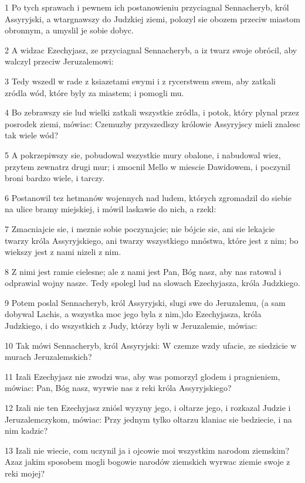 \par 1 Po tych sprawach i pewnem ich postanowieniu przyciagnal Sennacheryb, król Assyryjski, a wtargnawszy do Judzkiej ziemi, polozyl sie obozem przeciw miastom obronnym, a umyslil je sobie dobyc.
\par 2 A widzac Ezechyjasz, ze przyciagnal Sennacheryb, a iz twarz swoje obrócil, aby walczyl przeciw Jeruzalemowi:
\par 3 Tedy wszedl w rade z ksiazetami swymi i z rycerstwem swem, aby zatkali zródla wód, które byly za miastem; i pomogli mu.
\par 4 Bo zebrawszy sie lud wielki zatkali wszystkie zródla, i potok, który plynal przez posrodek ziemi, mówiac: Czemuzby przyszedlszy królowie Assyryjscy mieli znalesc tak wiele wód?
\par 5 A pokrzepiwszy sie, pobudowal wszystkie mury obalone, i nabudowal wiez, przytem zewnatrz drugi mur; i zmocnil Mello w miescie Dawidowem, i poczynil broni bardzo wiele, i tarczy.
\par 6 Postanowil tez hetmanów wojennych nad ludem, których zgromadzil do siebie na ulice bramy miejskiej, i mówil laskawie do nich, a rzekl:
\par 7 Zmacniajcie sie, i meznie sobie poczynajcie; nie bójcie sie, ani sie lekajcie twarzy króla Assyryjskiego, ani twarzy wszystkiego mnóstwa, które jest z nim; bo wiekszy jest z nami nizeli z nim.
\par 8 Z nimi jest ramie cielesne; ale z nami jest Pan, Bóg nasz, aby nas ratowal i odprawial wojny nasze. Tedy spolegl lud na slowach Ezechyjasza, króla Judzkiego.
\par 9 Potem poslal Sennacheryb, król Assyryjski, slugi swe do Jeruzalemu, (a sam dobywal Lachis, a wszystka moc jego byla z nim,)do Ezechyjasza, króla Judzkiego, i do wszystkich z Judy, którzy byli w Jeruzalemie, mówiac:
\par 10 Tak mówi Sennacheryb, król Assyryjski: W czemze wzdy ufacie, ze siedzicie w murach Jeruzalemskich?
\par 11 Izali Ezechyjasz nie zwodzi was, aby was pomorzyl glodem i pragnieniem, mówiac: Pan, Bóg nasz, wyrwie nas z reki króla Assyryjskiego?
\par 12 Izali nie ten Ezechyjasz zniósl wyzyny jego, i oltarze jego, i rozkazal Judzie i Jeruzalemczykom, mówiac: Przy jednym tylko oltarzu klaniac sie bedziecie, i na nim kadzic?
\par 13 Izali nie wiecie, com uczynil ja i ojcowie moi wszystkim narodom ziemskim? Azaz jakim sposobem mogli bogowie narodów ziemskich wyrwac ziemie swoje z reki mojej?
